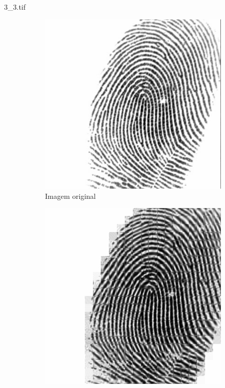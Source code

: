 \documentclass{beamer}
\begin{document}
    \begin{frame}{3\_3.tif}
        \begin{figure}
            \centering
            \begin{subfigure}[!ht]{0.32\textwidth}
                \includegraphics[width=\columnwidth]{Fingerprints/3_3.jpg}
                \caption{Imagem original}
            \end{subfigure}
            \begin{subfigure}[!ht]{0.32\textwidth}
                \includegraphics[width=\columnwidth]{Fingerprints/3_3_intermediate.jpg}

\end{subfigure}
\end{figure}
\end{frame}
\end{document}
